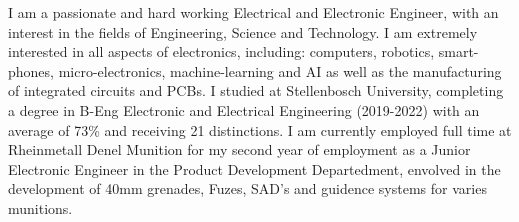 

I am a passionate and hard working Electrical and Electronic Engineer, with an interest in the fields of Engineering, Science and Technology. I am extremely interested in all aspects of electronics, including: computers,  robotics, smart-phones, micro-electronics, machine-learning and AI as well as the manufacturing of integrated circuits and PCBs. I studied at Stellenbosch University, completing a degree in B-Eng Electronic and Electrical Engineering (2019-2022) with an average of 73\% and receiving 21 distinctions. I am currently employed full time at Rheinmetall Denel Munition for my second year of employment as a Junior Electronic Engineer in the Product Development Departedment, envolved in the development of 40mm grenades, Fuzes, SAD's and guidence systems for varies munitions.

